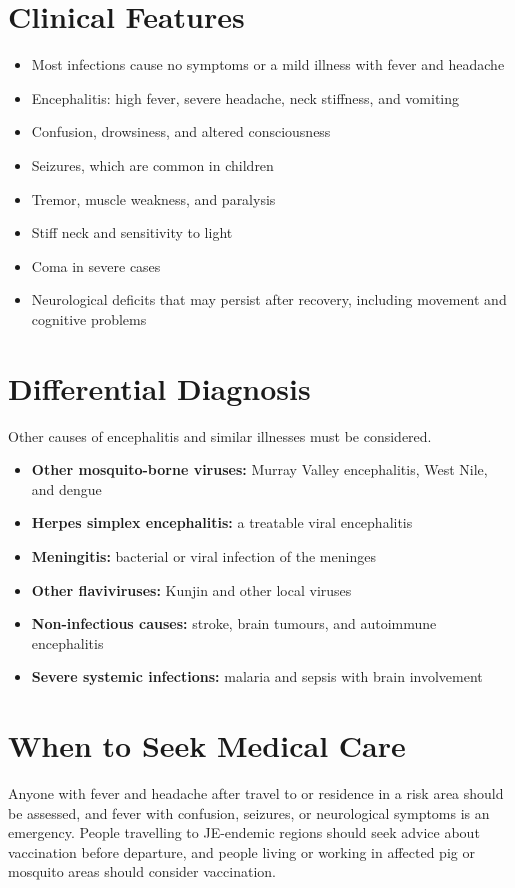 \section*{Clinical Features}
\begin{itemize}
    \item Most infections cause no symptoms or a mild illness with fever and headache
    \item Encephalitis: high fever, severe headache, neck stiffness, and vomiting
    \item Confusion, drowsiness, and altered consciousness
    \item Seizures, which are common in children
    \item Tremor, muscle weakness, and paralysis
    \item Stiff neck and sensitivity to light
    \item Coma in severe cases
    \item Neurological deficits that may persist after recovery, including movement and cognitive problems
\end{itemize}

\section*{Differential Diagnosis}
Other causes of encephalitis and similar illnesses must be considered.
\begin{itemize}
    \item \textbf{Other mosquito-borne viruses:} Murray Valley encephalitis, West Nile, and dengue
    \item \textbf{Herpes simplex encephalitis:} a treatable viral encephalitis
    \item \textbf{Meningitis:} bacterial or viral infection of the meninges
    \item \textbf{Other flaviviruses:} Kunjin and other local viruses
    \item \textbf{Non-infectious causes:} stroke, brain tumours, and autoimmune encephalitis
    \item \textbf{Severe systemic infections:} malaria and sepsis with brain involvement
\end{itemize}

\section*{When to Seek Medical Care}
Anyone with fever and headache after travel to or residence in a risk area should be assessed, and fever with confusion, seizures, or neurological symptoms is an emergency. People travelling to JE-endemic regions should seek advice about vaccination before departure, and people living or working in affected pig or mosquito areas should consider vaccination.

